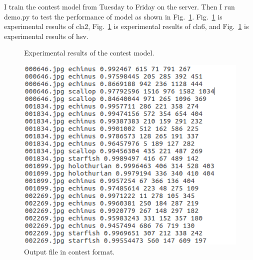 \documentclass[a4paper]{article}
\begin{document}
I train the contest model from Tuesday to Friday on the server. Then I run demo.py to test the performance of model as shown in Fig.~\ref{p2}. Fig.~\ref{p2} is experimental results of cla2, Fig.~\ref{p2} is experimental results of cla6, and Fig.~\ref{p2} is experimental results of hsv.
\begin{figure}
	\centering 
	\caption{Experimental results of the contest model.} 
	\label{p2} %
\end{figure}

\begin{figure}[!b]
	\begin{center}
		\includegraphics[scale=0.4]{figures/7.png}
	\end{center}
	\caption{Output file in contest format.}
	\label{p3}
\end{figure}
\end{document}

